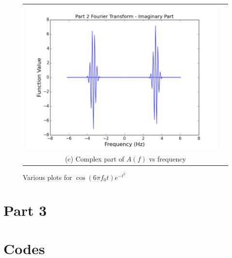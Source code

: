 \documentclass[11pt]{article}
\begin{document}
\begin{figure}[ht]
\begin{tabular}{cc}
\includegraphics[scale=.4]{prt2_fourComp.png}\\
\multicolumn{2}{c}{(c) Complex part of $A(f)$ vs frequency} \\[6pt]
\end{tabular}
\caption{Various plots for $\cos (6\pi f_0 t) e^{-t^2} $}
\end{figure}

\section{Part 3}

\section{Codes}
\end{document}
